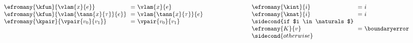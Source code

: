 \begin{TwoColumn}

  \multicolsbreak

\end{TwoColumn}

\begin{flushleft}
  \\[-2.7ex]{
  $\begin{array}{l@{\hspace{7em}}l}
    \begin{array}{l@{~~}c@{~}l}
      \efromany{\kfun}{\vlam{x}{e}} & = & \vlam{x}{e}
      \\
      \efromany{\kfun}{\vlam{\tann{x}{\tau}}{e}} & = & \vlam{\tann{x}{\tau}}{e}
      \\
      \efromany{\kpair}{\vpair{v_0}{v_1}} & = & \vpair{v_0}{v_1}
      \\
      \\
    \end{array}
  &
    \begin{array}{l@{~~}c@{~}l}
      \\
      \efromany{\kint}{i} & = & i
      \\
      \efromany{\knat}{i} & = & i
      \\ \sidecond{if $i \in \naturals$}
      \\
      \efromany{K}{v} & = & \boundaryerror
      \\ \sidecond{otherwise}
    \end{array}
  \end{array}$
}
\end{flushleft}
